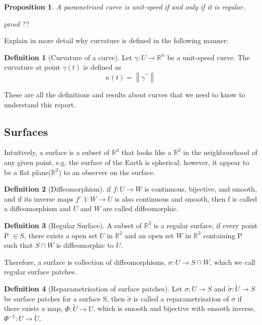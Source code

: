 \documentclass{article}
\theoremstyle{plain}
\newtheorem{proposition}{Proposition}
\theoremstyle{definition}
\newtheorem{definition}{Definition}
\theoremstyle{remark}
\newcommand{\R}{\mathbb{R}}
\begin{document}
\begin{proposition}
    A parametrised curve is unit-speed if and only if it is regular.
\end{proposition}
{\color{red} proof ??}

{\color{red} Explain in more detail why curvature is defined in the following manner: }
\begin{definition}[Curvature of a curve] \label{definition: Curvature of a curve}
    Let \( \gamma: U \rightarrow \R^n \) be a unit-speed curve. The curvature at point \( \gamma(t) \) is defined as \[ \kappa(t) = \left\lVert \gamma^{\prime\prime} \right\rVert  \]
\end{definition}

These are all the definitions and results about curves that we need to know to understand this report.
\subsection{Surfaces}
Intuitively, a surface is a subset of \( \R^3 \) that looks like a \( \R^2 \)  in the neighbourhood of any given point, e.g. the surface of the Earth is spherical; however, it appear to be a flat plane(\( \R^2 \)) to an observer on the surface. 

\begin{definition}[Diffeomorphism]
    if \( f: U \rightarrow W \) is continuous, bijective, and smooth, and if its inverse maps \( f^-1: W \rightarrow U\) is also continuous and smooth, then f is called a diffeomorphism and \(U\) and \(W\) are called diffeomorphic.
\end{definition}

\begin{definition}[Regular Surface]
    A subset of \( \R^3 \) is a regular surface, if every point P \( \in S \), there exists a open set \( U \text{ in } \R^2\) and an open set \( W \text{ in } \R^3\) containing P such that \( S \cap W\) is diffeomorphic to \(U\). 
\end{definition}
Therefore, a surface is collection of diffeomorphisms, \( \sigma: U \rightarrow S \cap W \), which we call regular surface patches. 

\begin{definition}[Reparametrisation of surface patches]
    Let \( \sigma: U \rightarrow S\) and \( \tilde{\sigma}: \tilde{U} \rightarrow S\) be surface patches for a surface S, then \( \tilde{\sigma} \) is called a reparametrisation of \( \sigma \) if there exists a map, \( \Phi: \tilde{U} \rightarrow U \), which is smooth and bijective with smooth inverse, \( \Phi^{-1}: U \rightarrow \tilde{U} \).
\end{definition}
\end{document}

